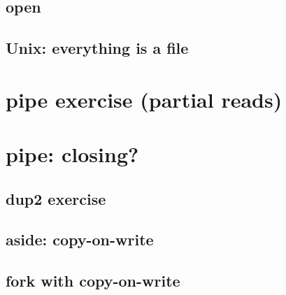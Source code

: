 

\subsection{open}


\subsection{Unix: everything is a file}



\section{pipe exercise (partial reads)}

\section{pipe: closing?}


\subsection{dup2 exercise}


\subsection{aside: copy-on-write}


\subsection{fork with copy-on-write}



